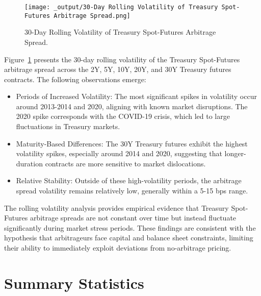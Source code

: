 \documentclass{article}
\begin{document}
\begin{figure}[h]
  \centering
  \texttt{[image: \_output/30-Day Rolling Volatility of Treasury Spot-Futures Arbitrage Spread.png]}
  \caption{30-Day Rolling Volatility of Treasury Spot-Futures Arbitrage Spread.}
  \label{fig:rolling_volatility}
\end{figure}



Figure~\ref{fig:rolling_volatility} presents the 30-day rolling volatility of the Treasury Spot-Futures arbitrage spread across the 2Y, 5Y, 10Y, 20Y, and 30Y Treasury futures contracts. The following observations emerge:

\begin{itemize}
    \item Periods of Increased Volatility: The most significant spikes in volatility occur around 2013-2014 and 2020, aligning with known market disruptions. The 2020 spike corresponds with the COVID-19 crisis, which led to large fluctuations in Treasury markets.
    \item Maturity-Based Differences: The 30Y Treasury futures exhibit the highest volatility spikes, especially around 2014 and 2020, suggesting that longer-duration contracts are more sensitive to market dislocations.
    \item Relative Stability: Outside of these high-volatility periods, the arbitrage spread volatility remains relatively low, generally within a 5-15 bps range.
\end{itemize}

The rolling volatility analysis provides empirical evidence that Treasury Spot-Futures arbitrage spreads are not constant over time but instead fluctuate significantly during market stress periods. These findings are consistent with the hypothesis that arbitrageurs face capital and balance sheet constraints, limiting their ability to immediately exploit deviations from no-arbitrage pricing.




\newpage


\section{Summary Statistics}
\end{document}
